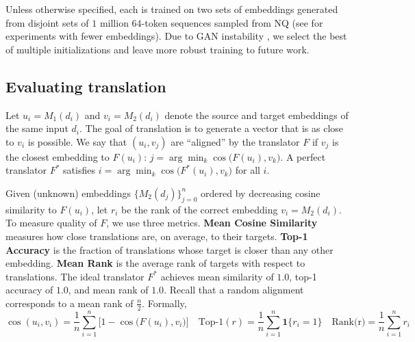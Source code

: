 Unless otherwise specified, each \atk{} is trained on two sets of embeddings generated from disjoint sets of $1$ million $64$-token sequences sampled from NQ (see  for experiments with fewer embeddings).  Due to GAN instability \cite{10.1145/3446374}, we select the best of multiple initializations and leave more robust training to future work.


\subsection{Evaluating translation}
\label{sec:ot}

Let $u_i = M_1(d_i)$ and $v_i = M_2(d_i)$ denote the source and target embeddings of the same input $d_i$.  The goal of translation is to generate a vector that is as close to $v_i$ is possible.  We say that \((u_i, v_j)\) are ``aligned'' by the translator \(F\) if \(v_j\) is the closest embedding to \(F(u_i)\): $j = \arg\min_k \cos\bigl(F(u_i), v_k\bigr).$
A perfect translator \(F^*\) satisfies \(i = \arg\min_k \cos\bigl(F^*(u_i), v_k\bigr)\) for all \(i\).


Given (unknown) embeddings $\{M_2(d_j)\}_{j=0}^n$ ordered by decreasing cosine similarity to $F(u_i)$, let $r_i$ be the rank of the correct embedding $v_i=M_2(d_i)$.  To measure quality of $F$, we use three metrics. \textbf{Mean Cosine Similarity} measures how close translations are, on average, to their targets. \textbf{Top-1 Accuracy} is the fraction of translations whose target is closer than any other embedding. \textbf{Mean Rank} is the average
rank of targets with respect to translations. The ideal translator \(F^*\) achieves mean similarity of \(1.0\), top-1 accuracy of \(1.0\), and mean rank of \(1.0\). Recall that a random alignment corresponds to a mean rank of $\frac{n}{2}$. Formally,
\begin{equation*}
    \cos(u_i, v_i)= \frac{1}{n}\sum_{i=1}^{n}\bigl[1 - \cos\bigl(F(u_i), v_i\bigr)\bigr] \quad \text{Top-1}(r)=\frac{1}{n}\sum_{i=1}^{n}\mathbf{1}\{r_i = 1\}\quad \text{Rank(r)}=\frac{1}{n}\sum_{i=1}^{n} r_i
\end{equation*}

